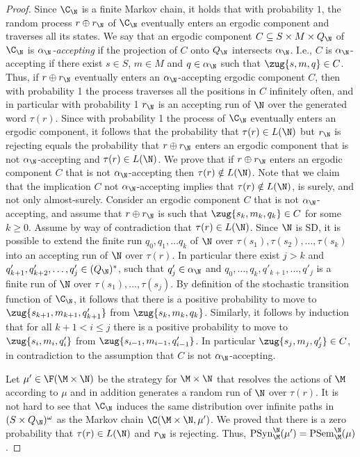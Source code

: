 \documentclass{lmcs}
\begin{document}
\begin{proof}
	Since $\C_\N$ is a finite Markov chain, it holds that with probability $1$, the random process $r\oplus r_\N$ of $\C_\N$ eventually enters an ergodic component and traverses all its states. We say that an ergodic component $C\subseteq S\times M\times Q_\N$ of $\C_\N$ is \emph{$\alpha_\N$-accepting} if the projection of $C$ onto $Q_\N$ intersects $\alpha_\N$. I.e., $C$ is $\alpha_\N$-accepting if there exist $s\in S$, $m\in M$ and $q\in \alpha_\N$ such that $\zug{s, m, q}\in C$. Thus, if $r\oplus r_\N$ eventually enters an $\alpha_\N$-accepting ergodic component $C$, then with probability 1 the process traverses all the positions in $C$ infinitely often, and in particular with probability 1 $r_\N$ is an accepting run of $\N$ over the generated word $\tau(r)$. Since with probability 1 the process of $\C_\N$ eventually enters an ergodic component, it follows that the probability that $\tau(r)\in L(\N)$ but $r_\N$ is rejecting equals the probability that $r\oplus r_\N$ enters an ergodic component that is not $\alpha_\N$-accepting and $\tau(r)\in L(\N)$. We prove that if $r\oplus r_\N$ enters an ergodic component $C$ that is not $\alpha_\N$-accepting then $\tau(r)\notin L(\N)$. Note that we claim that the implication $C$ not $\alpha_\N$-accepting implies that $\tau(r)\notin L(\N)$, is surely, and not only almost-surely. 
	Consider an ergodic component $C$ that is not $\alpha_\N$-accepting, and assume that $r\oplus r_\N$ is such that $\zug{s_k,m_k,q_k}\in C$ for some $k\geq 0$. Assume by way of contradiction that $\tau(r)\in L(\N)$. Since $\N$ is SD, it is possible to extend the finite run $q_0,q_1,\ldots q_k$ of $\N$ over $\tau(s_1),\tau(s_2),\ldots,\tau(s_k)$ into an accepting run of $\N$ over $\tau(r)$. In particular there exist $j>k$ and $q'_{k+1},q'_{k+2},\ldots,q'_j\in (Q_\N)^*$, such that $q'_j\in \alpha_\N$ and $q_0,\ldots,q_k,q'_{k+1},\ldots,q'_j$ is a finite run of $\N$ over $\tau(s_1),\ldots,\tau(s_j)$. By definition of the stochastic transition function of $\C_\N$, it follows that there is a positive probability to move to $\zug{s_{k+1},m_{k+1},q'_{k+1}}$ from $\zug{s_k,m_k,q_k}$. Similarly, it follows by induction that for all $k+1< i\leq j$ there is a positive probability to move to $\zug{s_i,m_i,q'_i}$ from $\zug{s_{i-1},m_{i-1},q'_{i-1}}$. In particular $\zug{s_j,m_j,q'_j}\in C$, in contradiction to the assumption that $C$ is not $\alpha_\N$-accepting.
	
	Let $\mu'\in \F(\M\times \N)$ be the strategy for $\M\times \N$ that resolves the actions of $\M$ according to $\mu$ and in addition generates a random run of $\N$ over $\tau(r)$. It is not hard to see that $\C_\N$ induces the same distribution over infinite paths in $(S\times Q_\N)^\omega$ as the Markov chain $\C(\M\times\N,\mu')$. We proved that there is a zero probability that $\tau(r)\in L(\N)$ and $r_\N$ is rejecting. Thus, $\mathrm{PSyn}^\N_\M(\mu')=\mathrm{PSem}^\N_\M(\mu)$. 
\end{proof}
\end{document}
